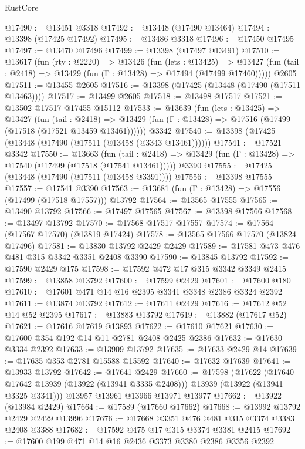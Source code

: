 \begin{lexlean}{RustCore}
\begin{coremodule}
@17490 := @13451 @3318
@17492 := @13448 (@17490 @13464)
@17494 := @13398 (@17425 @17492)
@17495 := @13486 @3318
@17496 := @17450 @17495
@17497 := @13470 @17496
@17499 := @13398 (@17497 @13491)
@17510 := @13617
    (fun (rty : @2220) =>
    @13426
      (fun (lets : @13425) =>
      @13427 (fun (tail : @2418) => @13429 (fun (Γ : @13428) => @17494 (@17499 @17460)))))
    @2605
@17511 := @13455 @2605
@17516 := @13398 (@17425 (@13448 (@17490 (@17511 @13463))))
@17517 := @13499 @2605
@17518 := @13498 @17517
@17521 := @13502 @17517 @17455 @15112
@17533 := @13639
    (fun (lets : @13425) =>
    @13427
      (fun (tail : @2418) =>
      @13429 (fun (Γ : @13428) => @17516 (@17499 (@17518 (@17521 @13459 @13461))))))
    @3342
@17540 := @13398 (@17425 (@13448 (@17490 (@17511 (@13458 (@3343 @13461))))))
@17541 := @17521 @3342
@17550 := @13663
    (fun (tail : @2418) => @13429 (fun (Γ : @13428) => @17540 (@17499 (@17518 (@17541 @13461)))))
    @3390
@17555 := @17425 (@13448 (@17490 (@17511 (@13458 @3391))))
@17556 := @13398 @17555
@17557 := @17541 @3390
@17563 := @13681 (fun (Γ : @13428) => @17556 (@17499 (@17518 @17557))) @13792
@17564 := @13565 @17555
@17565 := @13490 @13792
@17566 := @17497 @17565
@17567 := @13398 @17566
@17568 := @13497 @13792
@17570 := @17568 @17517 @17557
@17574 := @17564 (@17567 @17570) (@13819 @17424)
@17578 := @13565 @17566 @17570 (@13824 @17496)
@17581 := @13830 @13792 @2429 @2429
@17589 := @17581 @473 @476 @481 @315 @3342 @3351 @2408 @3390
@17590 := @13845 @13792
@17592 := @17590 @2429 @175
@17598 := @17592 @472 @17 @315 @3342 @3349 @2415
@17599 := @13858 @13792
@17600 := @17599 @2429
@17601 := @17600 @180
@17610 := @17601 @471 @14 @16 @2395 @3341 @3348 @2386 @3324 @2392
@17611 := @13874 @13792
@17612 := @17611 @2429
@17616 := @17612 @52 @14 @52 @2395
@17617 := @13883 @13792
@17619 := @13882 (@17617 @52)
@17621 := @17616 @17619 @13893
@17622 := @17610 @17621
@17630 := @17600 @354 @192 @14 @11 @2781 @2408 @2425 @2386
@17632 := @17630 @3334 @2392
@17633 := @13909 @13792
@17635 := @17633 @2429 @14
@17639 := @17635 @353 @2781 @15588 @15592
@17640 := @17632 @17639
@17641 := @13933 @13792
@17642 := @17641 @2429
@17660 := @17598
    (@17622
      (@17640 @17642 @13939 (@13922 (@13941 @3335 @2408)))
      @13939
      (@13922 (@13941 @3325 @3341)))
    @13957
    @13961
    @13966
    @13971
    @13977
@17662 := @13922 (@13984 @2429)
@17664 := @17589 (@17660 @17662)
@17668 := @13992 @13792 @2429 @2429 @13996
@17676 := @17668 @3351 @476 @481 @315 @3374 @3383 @2408 @3388
@17682 := @17592 @475 @17 @315 @3374 @3381 @2415
@17692 := @17600 @199 @471 @14 @16 @2436 @3373 @3380 @2386 @3356 @2392

\end{coremodule}
\end{lexlean}
